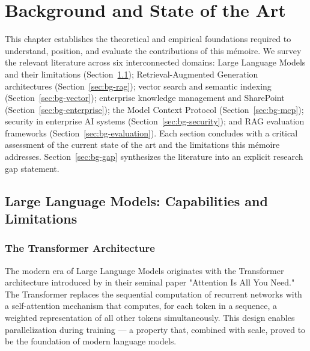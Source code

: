 \chapter{Background and State of the Art}
\label{chap:background}

This chapter establishes the theoretical and empirical foundations required to understand, position, and evaluate the contributions of this mémoire. We survey the relevant literature across six interconnected domains: Large Language Models and their limitations (Section~\ref{sec:bg-llm}); Retrieval-Augmented Generation architectures (Section~\ref{sec:bg-rag}); vector search and semantic indexing (Section~\ref{sec:bg-vector}); enterprise knowledge management and SharePoint (Section~\ref{sec:bg-enterprise}); the Model Context Protocol (Section~\ref{sec:bg-mcp}); security in enterprise AI systems (Section~\ref{sec:bg-security}); and RAG evaluation frameworks (Section~\ref{sec:bg-evaluation}). Each section concludes with a critical assessment of the current state of the art and the limitations this mémoire addresses. Section~\ref{sec:bg-gap} synthesizes the literature into an explicit research gap statement.

\section{Large Language Models: Capabilities and Limitations}
\label{sec:bg-llm}

\subsection{The Transformer Architecture}

The modern era of Large Language Models originates with the Transformer architecture introduced by \citet{Vaswani2017} in their seminal paper "Attention Is All You Need." The Transformer replaces the sequential computation of recurrent networks with a self-attention mechanism that computes, for each token in a sequence, a weighted representation of all other tokens simultaneously. This design enables parallelization during training — a property that, combined with scale, proved to be the foundation of modern language models.


